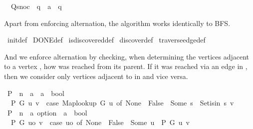 \begin{isabellebody}
\ \ Q{\isacharunderscore}{\kern0pt}snoc\ {\isacharcolon}{\kern0pt}{\isacharcolon}{\kern0pt}\ {\isachardoublequoteopen}{\isacharprime}{\kern0pt}q\ {\isasymRightarrow}\ {\isacharprime}{\kern0pt}a\ {\isasymRightarrow}\ {\isacharprime}{\kern0pt}q{\isachardoublequoteclose}\isanewline
{}%
\begin{isamarkuptext}%
Apart from enforcing alternation, the algorithm works identically to BFS.%
\end{isamarkuptext}\isamarkuptrue%
\isamarkupfalse%
\ init{\isacharunderscore}{\kern0pt}def\isanewline
\isanewline
{}\isamarkupfalse%
\ DONE{\isacharunderscore}{\kern0pt}def\isanewline
\isanewline
{}\isamarkupfalse%
\ is{\isacharunderscore}{\kern0pt}discovered{\isacharunderscore}{\kern0pt}def\isanewline
\isanewline
{}\isamarkupfalse%
\ discover{\isacharunderscore}{\kern0pt}def\isanewline
\isanewline
{}\isamarkupfalse%
\ traverse{\isacharunderscore}{\kern0pt}edge{\isacharunderscore}{\kern0pt}def%
\begin{isamarkuptext}%
And we enforce alternation by checking, when determining the vertices adjacent to a vertex
, how  was reached from its parent. If it was reached via an edge in ,
then we consider only vertices adjacent to  in  and vice versa.%
\end{isamarkuptext}\isamarkuptrue%
\isamarkupfalse%
\ P\ {\isacharcolon}{\kern0pt}{\isacharcolon}{\kern0pt}\ {\isachardoublequoteopen}{\isacharprime}{\kern0pt}n\ {\isasymRightarrow}\ {\isacharprime}{\kern0pt}a\ {\isasymRightarrow}\ {\isacharprime}{\kern0pt}a\ {\isasymRightarrow}\ bool{\isachardoublequoteclose}\ \isanewline
\ \ {\isachardoublequoteopen}P\ G\ u\ v\ {\isasymequiv}\ case\ Map{\isacharunderscore}{\kern0pt}lookup\ G\ u\ of\ None\ {\isasymRightarrow}\ False\ {\isacharbar}{\kern0pt}\ Some\ s\ {\isasymRightarrow}\ Set{\isacharunderscore}{\kern0pt}isin\ s\ v{\isachardoublequoteclose}\isanewline
\isanewline
{}\isamarkupfalse%
\ P{\isacharprime}{\kern0pt}\ {\isacharcolon}{\kern0pt}{\isacharcolon}{\kern0pt}\ {\isachardoublequoteopen}{\isacharprime}{\kern0pt}n\ {\isasymRightarrow}\ {\isacharprime}{\kern0pt}a\ option\ {\isasymRightarrow}\ {\isacharprime}{\kern0pt}a\ {\isasymRightarrow}\ bool{\isachardoublequoteclose}\ \isanewline
\ \ {\isachardoublequoteopen}P{\isacharprime}{\kern0pt}\ G\ uo\ v\ {\isasymequiv}\ case\ uo\ of\ None\ {\isasymRightarrow}\ False\ {\isacharbar}{\kern0pt}\ Some\ u\ {\isasymRightarrow}\ P\ G\ u\ v{\isachardoublequoteclose}\isanewline

\end{isabellebody}
